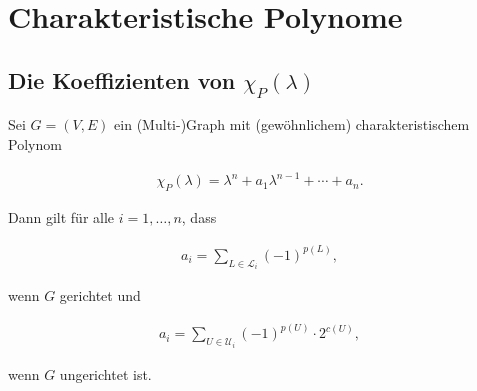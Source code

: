 \chapter{Charakteristische Polynome} \label{chap:characteristic_polynomials}

    \section{Die Koeffizienten von $\chi_P(\lambda)$}

        \begin{theorem} \label{thm:characteristic_coefficints}

            Sei $G = (V, E)$ ein (Multi-)Graph mit (gewöhnlichem) charakteristischem Polynom

            \begin{align*}
                \chi_P(\lambda)
                =
                \lambda^n + a_1 \lambda^{n-1} + \cdots + a_n.
            \end{align*}

            Dann gilt für alle $i = 1, \dots, n$, dass

            \begin{align} \label{eq:characteristic_coefficints_directed}
                a_i = \sum_{L \in \mathcal L_i} (-1)^{p(L)},
            \end{align}

            wenn $G$ gerichtet und

            \begin{align} \label{eq:characteristic_coefficints_undirected}
                a_i = \sum_{U \in \mathcal U_i} (-1)^{p(U)} \cdot 2^{c(U)},
            \end{align}

            wenn $G$ ungerichtet ist.

        \end{theorem}

